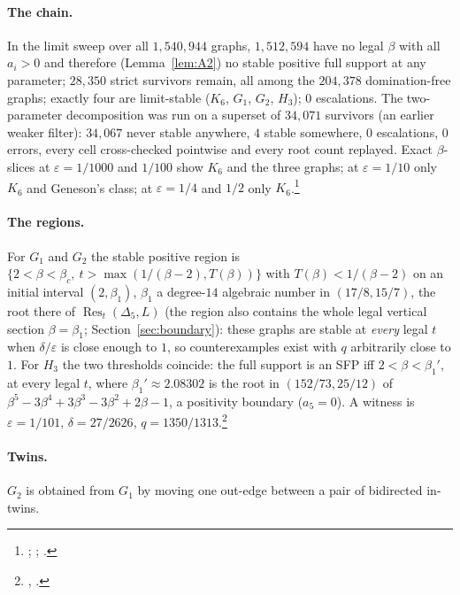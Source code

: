 \documentclass[11pt]{article}
\theoremstyle{definition}
\newcommand{\eps}{\varepsilon}
\begin{document}
\paragraph{The chain.} In the limit sweep over all $1{,}540{,}944$ graphs, $1{,}512{,}594$ have no legal $\beta$ with all
$a_i>0$ and therefore (Lemma~\ref{lem:A2}) no stable positive full support at any parameter; $28{,}350$ strict survivors
remain, all among the $204{,}378$ domination-free graphs; exactly four are limit-stable ($K_6$, $G_1$, $G_2$, $H_3$);
$0$ escalations. The two-parameter decomposition was run on a superset of $34{,}071$ survivors (an earlier weaker
filter): $34{,}067$ never stable anywhere, $4$ stable somewhere, $0$ escalations, $0$ errors, every cell cross-checked
pointwise and every root count replayed. Exact $\beta$-slices at $\eps=1/1000$ and $1/100$ show $K_6$ and the three
graphs; at $\eps=1/10$ only $K_6$ and Geneson's class; at $\eps=1/4$ and $1/2$ only $K_6$.\footnote{; ; .}

\paragraph{The regions.} For $G_1$ and $G_2$ the stable positive region is
$\{2<\beta<\beta_c,\ t>\max(1/(\beta-2),T(\beta))\}$ with $T(\beta)<1/(\beta-2)$ on an initial interval $(2,\beta_1)$,
$\beta_1$ a degree-$14$ algebraic number in $(17/8,15/7)$, the root there of $\operatorname{Res}_t(\Delta_5,L)$ (the
region also contains the whole legal vertical section $\beta=\beta_1$; Section~\ref{sec:boundary}): these graphs are stable at \emph{every} legal $t$ when $\delta/\eps$
is close enough to $1$, so counterexamples exist with $q$ arbitrarily close to $1$. For $H_3$ the two thresholds
coincide: the full support is an SFP iff $2<\beta<\beta_1'$, at every legal $t$, where $\beta_1'\approx2.08302$ is the root
in $(152/73,25/12)$ of $\beta^5-3\beta^4+3\beta^3-3\beta^2+2\beta-1$, a positivity boundary ($a_5=0$). A witness is
$\eps=1/101$, $\delta=27/2626$, $q=1350/1313$.\footnote{, .}

\paragraph{Twins.} $G_2$ is obtained from $G_1$ by moving one out-edge between a pair of bidirected in-twins.
\end{document}
